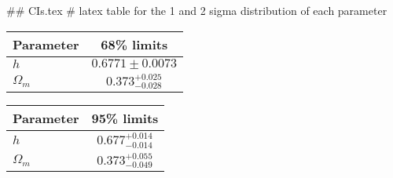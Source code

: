 ## CIs.tex
# latex table for the 1 and 2 sigma distribution of each parameter

\begin{tabular} { l  c}
 Parameter &  68\% limits\\
\hline
{\boldmath$h              $} & $0.6771\pm 0.0073          $\\
{\boldmath$\Omega_m       $} & $0.373^{+0.025}_{-0.028}   $\\
\hline
\end{tabular}

\begin{tabular} { l  c}
 Parameter &  95\% limits\\
\hline
{\boldmath$h              $} & $0.677^{+0.014}_{-0.014}   $\\
{\boldmath$\Omega_m       $} & $0.373^{+0.055}_{-0.049}   $\\
\hline
\end{tabular}
